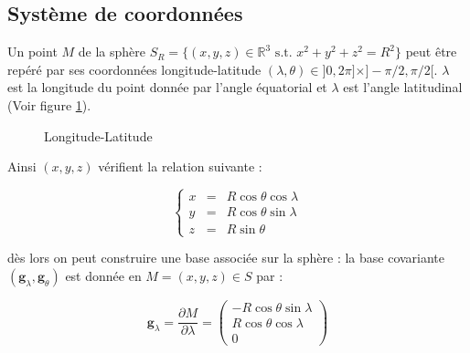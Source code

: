 
\subsection{Système de coordonnées}

Un point $M$ de la sphère $ S_R = \{ (x,y,z) \in \mathbb{R}^3 \text{ s.t. } x^2 + y^2 + z^2 = R^2\}$ peut être repéré par ses coordonnées longitude-latitude $(\lambda, \theta ) \in ]0, 2\pi ] \times ]- \pi/2, \pi/2 [$. $\lambda$ est la longitude du point donnée par l'angle équatorial et $\lambda$ est l'angle latitudinal (Voir figure \ref{fig:lonlat_sphere}).

\begin{figure}
\begin{center}
\end{center}
\caption{Longitude-Latitude}
\label{fig:lonlat_sphere}
\end{figure}


Ainsi $(x,y,z)$ vérifient la relation suivante :

\begin{equation}
\left\lbrace 
\begin{array}{rcl}
x & = & R \cos \theta \cos \lambda \\
y & = & R \cos \theta \sin \lambda \\
z & = & R \sin \theta
\end{array}
\right.
\end{equation}

dès lors on peut construire une base associée sur la sphère : la base covariante $( \mathbf{g}_{\lambda}, \mathbf{g}_{\theta})$ est donnée en $M = (x,y,z) \in S$ par :

\begin{equation}
\mathbf{g}_{\lambda} = \dfrac{\partial M}{\partial \lambda} = \begin{pmatrix}
- R \cos \theta \sin \lambda \\ 
R \cos \theta \cos \lambda \\ 
0
\end{pmatrix} 
\end{equation}

